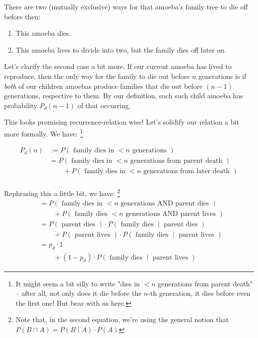 There are two (mutually exclusive) ways for that amoeba's family tree to die off before then: 
\begin{enumerate}
\item This amoeba dies.
\item This amoeba lives to divide into two, but the family dies off later on.
\end{enumerate} \hfill

Let's clarify the second case a bit more. If our current amoeba has lived to reproduce, then the only way for the family to die out before $n$ generations is if \emph{both} of our children amoebas produce families that die out before $(n-1)$ generations, respective to them. By our definition, each such child amoeba has probability $P_d(n-1)$ of that occurring.

This looks promising recurrence-relation wise! Let's solidify our relation a bit more formally. We have: \footnote{It might seem a bit silly to write "dies in $<n$ generations from parent death" -- after all, not only does it die before the $n$-th generation, it dies before even the first one! But bear with us here.}

\begin{align*}
P_d(n) &:= P(\text{ family dies in $< n$ generations }) \\
&= P(\text{ family dies in $< n$ generations from parent death }) \\
&\qquad + P(\text{ family dies in $< n$ generations from later death }) \\ %
\end{align*}


Rephrasing this a little bit, we have: \footnote{Note that, in the second equation, we're using the general notion that $P(B \cap A) = P\left(B \middle| A\right) \cdot P(A)$}
\begin{align*}
&= P(\text{ family dies in $< n$ generations AND parent dies }) \\
&\qquad + P(\text{ family dies $< n$ generations AND parent lives }) \\
&= P(\text{ parent dies }) \cdot P\left(\text{ family dies } \middle| \text{ parent dies }\right) \\
&\qquad + P(\text{ parent lives }) \cdot P\left(\text{ family dies } \middle| \text{ parent lives }\right) \\
&= p_d \cdot 1 \\
&\qquad + (1 - p_d) \cdot P\left(\text{ family dies } \middle| \text{ parent lives }\right)
\end{align*}

